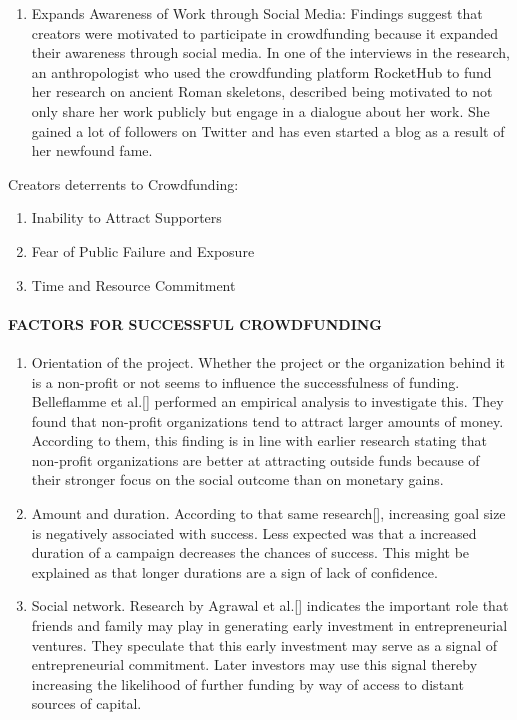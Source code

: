 \begin{enumerate}
      \item Expands Awareness  of Work  through Social Media:
            Findings suggest that creators were motivated to
            participate in crowdfunding because it expanded their awareness through social media. In one of the
            interviews in the research, an anthropologist who used the crowdfunding platform RocketHub to fund
            her research on ancient Roman skeletons, described being motivated to not only share her work publicly but engage in a dialogue about her work. She gained a lot of followers on Twitter and has even
            started a blog as a result of her newfound fame.

\end{enumerate}

Creators deterrents to Crowdfunding:
\begin{enumerate}
      \item Inability to Attract Supporters
      \item Fear of Public Failure and Exposure
      \item Time and Resource Commitment
\end{enumerate}

\paragraph*{FACTORS FOR SUCCESSFUL CROWDFUNDING}
\begin{enumerate}
      \item Orientation of the project. Whether the project or the organization behind it is a non-profit or not
            seems to influence the successfulness of funding. Belleflamme et al.[\cite{doi:10.1080/13691066.2013.785151}] performed an empirical analysis
            to investigate this. They found that non-profit organizations tend to attract larger amounts of money.
            According to them, this finding is in line with earlier research stating that non-profit organizations
            are better at attracting outside funds because of their stronger focus on the social outcome than on
            monetary gains.

      \item Amount and duration. According to that same research[\cite{doi:10.1080/13691066.2013.785151}], increasing goal size is negatively associated
            with success. Less expected was that a increased duration of a campaign decreases the chances of
            success. This might be explained as that longer durations are a sign of lack of confidence.

      \item Social network. Research by Agrawal et al.[\cite{NBERw16820}] indicates the important role that friends and family may
            play in generating early investment in entrepreneurial ventures. They speculate that this early investment may serve as a signal of entrepreneurial commitment. Later investors may use this signal thereby
            increasing the likelihood of further funding by way of access to distant sources of capital.
\end{enumerate}


